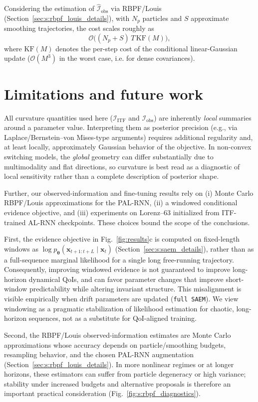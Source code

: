 \documentclass[twoside]{article}
\theoremstyle{plain}
\theoremstyle{definition}
\theoremstyle{remark}
\newcommand{\Io}{\bm{\mathcal{I}}_{\mathrm{obs}}}
\newcommand{\Iohat}{\bm{\widehat{\mathcal{I}}}_{\mathrm{obs}}}
\begin{document}
Considering the estimation of $\Iohat$ via RBPF/Louis (Section~\ref{sec:s:rbpf_louis_details}), with $N_p$ particles and $S$ approximate smoothing trajectories, the cost scales roughly as
\begin{equation}
\mathcal O\big((N_p+S)\,T\,\mathrm{KF}(M)\big),
\end{equation}
where $\mathrm{KF}(M)$ denotes the per-step cost of the conditional linear-Gaussian update ($\mathcal O(M^3)$ in the worst case, i.e. for dense covariances).

\section{Limitations and future work}
\label{sec:s:limitations}
All curvature quantities used here ($\bm{\mathcal I}_{\mathrm{ITF}}$ and $\Io$) are inherently \emph{local} summaries around a parameter value. Interpreting them as posterior precision (e.g., via Laplace/Bernstein--von Mises-type arguments) requires additional regularity and, at least locally, approximately Gaussian behavior of the objective. In non-convex switching models, the \emph{global} geometry can differ substantially due to multimodality and flat directions, so curvature is best read as a diagnostic of local sensitivity rather than a complete description of posterior shape.

Further, our observed-information and fine-tuning results rely on (i) Monte Carlo RBPF/Louis approximations for the PAL-RNN, (ii) a windowed conditional evidence objective, and (iii) experiments on Lorenz--63 initialized from ITF-trained AL-RNN checkpoints. These choices bound the scope of the conclusions.

First, the evidence objective in Fig.~\ref{fig:results}c is computed on fixed-length windows as $\log p_{\bm\theta}(\bm x_{t+1:t+L}\mid \bm x_t)$ (Section~\ref{sec:s:saem_details}), rather than as a full-sequence marginal likelihood for a single long free-running trajectory. Consequently, improving windowed evidence is not guaranteed to improve long-horizon dynamical QoIs, and can favor parameter changes that improve short-window predictability while altering invariant structure. This misalignment is visible empirically when drift parameters are updated (\texttt{full SAEM}). We view windowing as a pragmatic stabilization of likelihood estimation for chaotic, long-horizon sequences, not as a substitute for QoI-aligned training.

Second, the RBPF/Louis observed-information estimates are Monte Carlo approximations whose accuracy depends on particle/smoothing budgets, resampling behavior, and the chosen PAL-RNN augmentation (Section~\ref{sec:s:rbpf_louis_details}). In more nonlinear regimes or at longer horizons, these estimators can suffer from particle degeneracy or high variance; stability under increased budgets and alternative proposals is therefore an important practical consideration (Fig.~\ref{fig:s:rbpf_diagnostics}).
\end{document}
